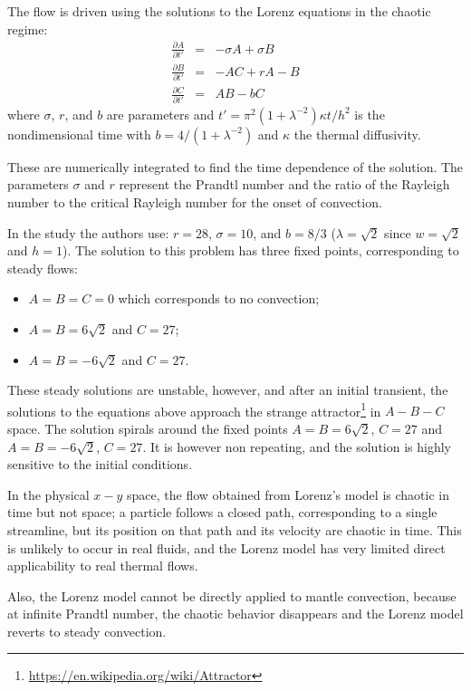 The flow is driven using the solutions to the Lorenz equations in the chaotic regime:
\begin{eqnarray}
\frac{\partial A}{\partial t'} &=& -\sigma A + \sigma B \label{eq:Lorenz1}\\ 
\frac{\partial B}{\partial t'} &=& -AC + rA -B \label{eq:Lorenz2}\\ 
\frac{\partial C}{\partial t'} &=& AB - bC \label{eq:Lorenz3}
\end{eqnarray}
where $\sigma$, $r$, and $b$ are parameters and $t'=\pi^2 (1+\lambda^{-2}) \kappa t /h^2$
is the nondimensional time with $b=4/(1+\lambda^{-2})$ and $\kappa$ the thermal diffusivity. 

These are numerically integrated to find the time dependence of the solution. 
The parameters $\sigma$ and $r$ represent the Prandtl number  and the ratio
of the Rayleigh number to the critical Rayleigh number for the onset of convection.

In the study the authors use: $r=28$, $\sigma=10$, and $b=8/3$ ($\lambda=\sqrt 2$ since
$w=\sqrt{2}$ and $h=1$).
The solution to this problem has three fixed points, corresponding to
steady flows:

\begin{itemize}
\item $A=B=C=0$ which corresponds to no convection;
\item $A=B=6\sqrt 2$ and $C=27$;
\item $A=B=-6\sqrt 2$ and $C=27$.
\end{itemize}
These steady solutions are unstable, however, and after an initial transient, the solutions 
to the equations above approach the strange 
attractor\footnote{\url{https://en.wikipedia.org/wiki/Attractor}} in $A-B-C$ space.
The solution spirals around the fixed points $A=B=6\sqrt 2$, $C=27$ and 
$A=B=-6\sqrt 2$, $C=27$. It is however non repeating, and the solution is highly sensitive to the initial 
conditions. 

In the physical $x-y$ space, the flow obtained from Lorenz's
model is chaotic in time but not space; a particle follows
a closed path, corresponding to a single streamline, but
its position on that path and its velocity are chaotic in time.
This is unlikely to occur in real fluids, and the Lorenz model 
has very limited direct applicability to real thermal flows.

Also, the Lorenz model cannot be directly applied to mantle convection, 
because at infinite Prandtl number, the chaotic behavior disappears and the Lorenz 
model reverts to steady convection.

